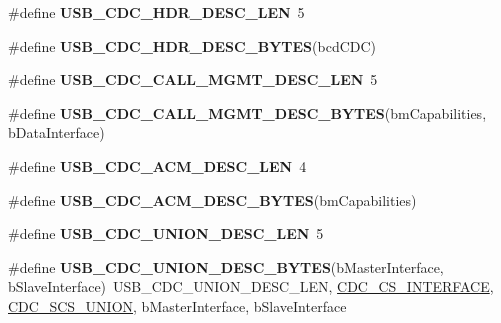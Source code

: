 \begin{DoxyCompactItemize}
\mbox{\label{group__cdc__protocol__group_ga67935f908395b3d0e82538f8ce8a05a7}} 
\#define {\bfseries U\+S\+B\+\_\+\+C\+D\+C\+\_\+\+H\+D\+R\+\_\+\+D\+E\+S\+C\+\_\+\+L\+EN}~5
\item 
\#define {\bfseries U\+S\+B\+\_\+\+C\+D\+C\+\_\+\+H\+D\+R\+\_\+\+D\+E\+S\+C\+\_\+\+B\+Y\+T\+ES}(bcd\+C\+DC)
\item 
\mbox{\label{group__cdc__protocol__group_ga124ea7a2316f2961dc5ef8bf6d6270c6}} 
\#define {\bfseries U\+S\+B\+\_\+\+C\+D\+C\+\_\+\+C\+A\+L\+L\+\_\+\+M\+G\+M\+T\+\_\+\+D\+E\+S\+C\+\_\+\+L\+EN}~5
\item 
\#define {\bfseries U\+S\+B\+\_\+\+C\+D\+C\+\_\+\+C\+A\+L\+L\+\_\+\+M\+G\+M\+T\+\_\+\+D\+E\+S\+C\+\_\+\+B\+Y\+T\+ES}(bm\+Capabilities,  b\+Data\+Interface)
\item 
\mbox{\label{group__cdc__protocol__group_gae917b874133597fb36e3a150536c9215}} 
\#define {\bfseries U\+S\+B\+\_\+\+C\+D\+C\+\_\+\+A\+C\+M\+\_\+\+D\+E\+S\+C\+\_\+\+L\+EN}~4
\item 
\#define {\bfseries U\+S\+B\+\_\+\+C\+D\+C\+\_\+\+A\+C\+M\+\_\+\+D\+E\+S\+C\+\_\+\+B\+Y\+T\+ES}(bm\+Capabilities)
\item 
\mbox{\label{group__cdc__protocol__group_gabb2595b45219fab57220eb2b218953ab}} 
\#define {\bfseries U\+S\+B\+\_\+\+C\+D\+C\+\_\+\+U\+N\+I\+O\+N\+\_\+\+D\+E\+S\+C\+\_\+\+L\+EN}~5
\item 
\mbox{\label{group__cdc__protocol__group_ga56dfdf9d864ab7a4663b59b2ce8eeaba}} 
\#define {\bfseries U\+S\+B\+\_\+\+C\+D\+C\+\_\+\+U\+N\+I\+O\+N\+\_\+\+D\+E\+S\+C\+\_\+\+B\+Y\+T\+ES}(b\+Master\+Interface,  b\+Slave\+Interface)~U\+S\+B\+\_\+\+C\+D\+C\+\_\+\+U\+N\+I\+O\+N\+\_\+\+D\+E\+S\+C\+\_\+\+L\+EN, \hyperlink{group__cdc__protocol__group_gafe0ca40b5aacc5c750f952af952583d2}{C\+D\+C\+\_\+\+C\+S\+\_\+\+I\+N\+T\+E\+R\+F\+A\+CE}, \hyperlink{group__cdc__protocol__group_ga27581d98e9052d843b2f4767f7d39110}{C\+D\+C\+\_\+\+S\+C\+S\+\_\+\+U\+N\+I\+ON}, b\+Master\+Interface, b\+Slave\+Interface
\end{DoxyCompactItemize}
